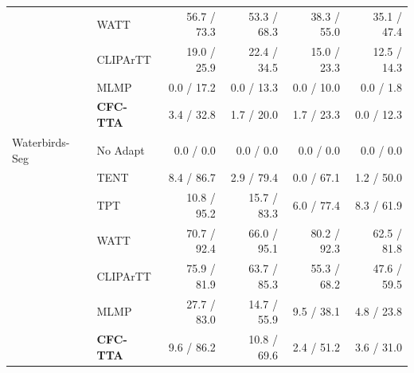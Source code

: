 \begin{table}[t]
\begin{tabular}{llrrrr}
 & WATT & 56.7 / 73.3 & 53.3 / 68.3 & 38.3 / 55.0 & 35.1 / 47.4 \\
 & CLIPArTT & 19.0 / 25.9 & 22.4 / 34.5 & 15.0 / 23.3 & 12.5 / 14.3 \\
 & MLMP & 0.0 / 17.2 & 0.0 / 13.3 & 0.0 / 10.0 & 0.0 / 1.8 \\
 & \textbf{CFC-TTA} & 3.4 / 32.8 & 1.7 / 20.0 & 1.7 / 23.3 & 0.0 / 12.3 \\
\midrule
Waterbirds-Seg & No Adapt & 0.0 / 0.0 & 0.0 / 0.0 & 0.0 / 0.0 & 0.0 / 0.0 \\
 & TENT & 8.4 / 86.7 & 2.9 / 79.4 & 0.0 / 67.1 & 1.2 / 50.0 \\
 & TPT & 10.8 / 95.2 & 15.7 / 83.3 & 6.0 / 77.4 & 8.3 / 61.9 \\
 & WATT & 70.7 / 92.4 & 66.0 / 95.1 & 80.2 / 92.3 & 62.5 / 81.8 \\
 & CLIPArTT & 75.9 / 81.9 & 63.7 / 85.3 & 55.3 / 68.2 & 47.6 / 59.5 \\
 & MLMP & 27.7 / 83.0 & 14.7 / 55.9 & 9.5 / 38.1 & 4.8 / 23.8 \\
 & \textbf{CFC-TTA} & 9.6 / 86.2 & 10.8 / 69.6 & 2.4 / 51.2 & 3.6 / 31.0 \\
\bottomrule
\end{tabular}
\end{table}
